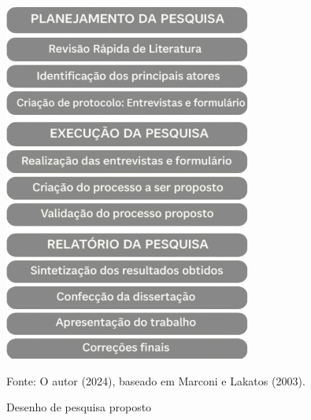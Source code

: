 \begin{figure}[H]
    \caption{Desenho de pesquisa proposto}
    \centering
    \includegraphics[width=0.6\linewidth]{images/metodologia/desenhodepesquisa.png}
    \label{fig:desenhodepesquisa}
    \vspace{0.2cm}

{\centering Fonte: O autor (2024), baseado em Marconi e Lakatos (2003). \par}
\end{figure}